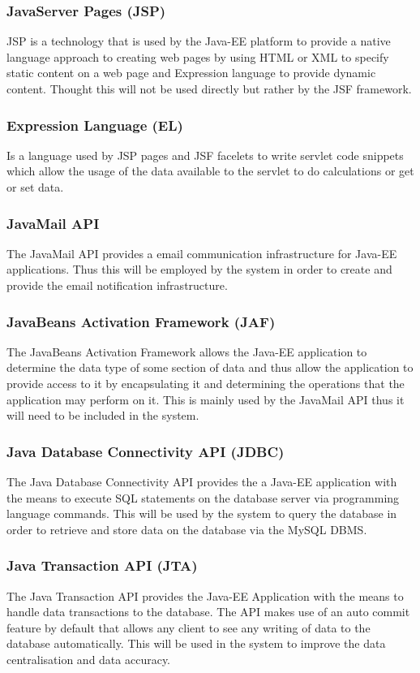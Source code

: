 \documentclass[12pt]{article}
\begin{document}
\subsubsection{JavaServer Pages (JSP)}
JSP is a technology that is used by the Java-EE platform to provide a native language approach to creating web pages by using HTML or XML to specify static content on a web page and Expression language to provide dynamic content. Thought this will not be used directly but rather by the JSF framework.
 
\subsubsection{Expression Language (EL)}
Is a language used by JSP pages and JSF facelets to write servlet code snippets which allow the usage of the data available to the servlet to do calculations or get or set data.

\subsubsection{JavaMail API}
The JavaMail API provides a email communication infrastructure for Java-EE applications. Thus this will be employed by the system in order to create and provide the email notification infrastructure.

\subsubsection{JavaBeans Activation Framework (JAF)}
The JavaBeans Activation Framework allows the Java-EE application to determine the data type of some section of data and thus allow the application to provide access to it by encapsulating it and determining the operations that the application may perform on it. This is mainly used by the JavaMail API thus it will need to be included in the system. 

\subsubsection{Java Database Connectivity API (JDBC)}
The Java Database Connectivity API provides the a Java-EE application with the means to execute SQL statements on the database server via programming language commands. This will be used by the system to query the database in order to retrieve and store data on the database via the MySQL DBMS.

\subsubsection{Java Transaction API (JTA)}
The Java Transaction API provides the Java-EE Application with the means to handle data transactions to the database. The API makes use of an auto commit feature by default that allows any client to see any writing of data to the database automatically. This will be used in the system to improve the data centralisation and data accuracy.
\end{document}
